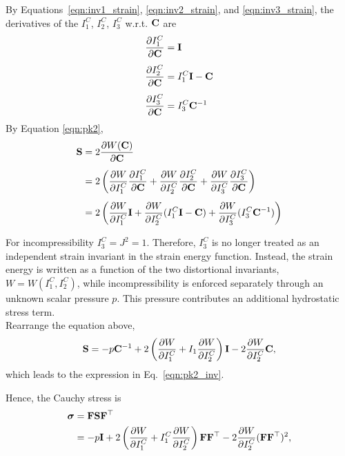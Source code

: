 \documentclass[12pt, a4paper]{article}
\numberwithin{equation}{section}
\begin{document}
\begin{tcolorbox}[title = {\textbf{Derivation of Equation \ref{eqn:pk2_inv}}}, breakable]
    By Equations~\eqref{eqn:inv1_strain}, \eqref{eqn:inv2_strain}, and \eqref{eqn:inv3_strain}, the derivatives of the $I_1^C$, $I_2^C$, $I_3^C$ w.r.t. $\mathbf{C}$ are
    \begin{align}
        \frac{\partial I_1^C}{\partial \mathbf{C}} & = \mathbf{I} \\[1ex]
        \frac{\partial I_2^C}{\partial \mathbf{C}} & = I_1^C \mathbf{I} - \mathbf{C} \\[1ex]
        \frac{\partial I_3^C}{\partial \mathbf{C}} & = I_3^C \mathbf{C}^{-1}
    \end{align}
    By Equation \ref{eqn:pk2},
    \begin{align}
    \begin{split}
        \mathbf{S} 
        & = 2 \frac{\partial W(\mathbf{C})}{\partial \mathbf{C}} \\[1ex]
        & = 2 \left( \frac{\partial W}{\partial I_1^C} \frac{\partial I_1^C}{\partial \mathbf{C}} + \frac{\partial W}{\partial I_2^C} \frac{\partial I_2^C}{\partial \mathbf{C}} + \frac{\partial W}{\partial I_3^C} \frac{\partial I_3^C}{\partial \mathbf{C}} \right) \\[1ex]
        & = 2 \left( \frac{\partial W}{\partial I_1^C} \mathbf{I} + \frac{\partial W}{\partial I_2^C} (I_1^C \mathbf{I} - \mathbf{C}) + \frac{\partial W}{\partial I_3^C} (I_3^C \mathbf{C}^{-1}) \right) \\[1ex]
    \end{split}
    \end{align}
    For incompressibility $I_3^C = J^2 = 1$.  Therefore, $I_3^C$ is no longer treated as an independent strain invariant in the strain energy function. Instead, the strain energy is written as a function of the two distortional invariants, $W = W(I_1^C,I_2^C)$, while incompressibility is enforced separately through an unknown scalar pressure $p$. This pressure contributes an additional hydrostatic stress term.\\
    
    Rearrange the equation above,
    \[
        \mathbf{S} = -p \mathbf{C}^{-1} + 2 \left( \frac{\partial W}{\partial I_1^C} + I_1 \frac{\partial W}{\partial I_2^C} \right) \mathbf{I} - 2 \frac{\partial W}{\partial I_2^C} \mathbf{C},
    \]
    which leads to the expression in Eq.~\eqref{eqn:pk2_inv}.
\end{tcolorbox}

Hence, the Cauchy stress is
\begin{align}
\begin{split}
    \boldsymbol{\sigma}
    & = \mathbf{F} \mathbf{S} \mathbf{F}^\top \\
    & = -p \mathbf{I} + 2 \left( \frac{\partial W}{\partial I_1^C} + I_1^C \frac{\partial W}{\partial I_2^C} \right) \mathbf{F} \mathbf{F}^\top - 2 \frac{\partial W}{\partial I_2^C} (\mathbf{F} \mathbf{F}^\top)^2,
\end{split}
\end{align}
\end{document}
